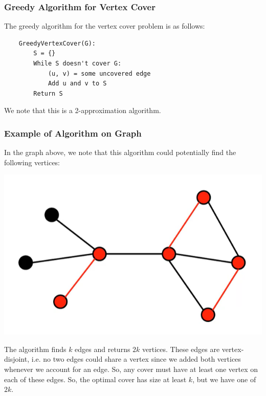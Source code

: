 \documentclass[letterpaper]{article}
\begin{document}
\subsubsection{Greedy Algorithm for Vertex Cover}
The greedy algorithm for the vertex cover problem is as follows: 
\begin{verbatim}
    GreedyVertexCover(G):
        S = {}
        While S doesn't cover G:
            (u, v) = some uncovered edge 
            Add u and v to S
        Return S
\end{verbatim}
We note that this is a 2-approximation algorithm. 

\subsubsection{Example of Algorithm on Graph}
In the graph above, we note that this algorithm could potentially find the following vertices:
\begin{center}
    \includegraphics[scale=0.5]{../assets/vertex_cov_3.png}
\end{center}
The algorithm finds $k$ edges and returns $2k$ vertices. These edges are vertex-disjoint, i.e. no two edges could share a vertex since we added both vertices whenever we account for an edge. So, any cover must have at least one vertex on each of these edges. So, the optimal cover has size at least $k$, but we have one of $2k$. 
\end{document}
